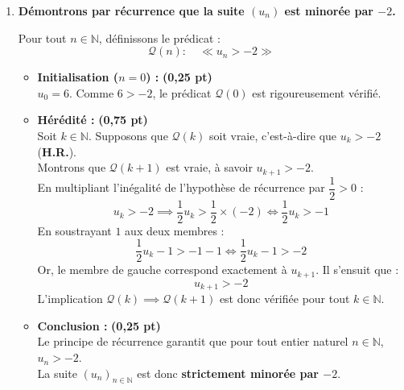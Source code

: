 \documentclass[11pt,a4paper]{article}
\newcommand{\bareme}[1]{\hfill\textbf{\textcolor{secondary}{\sffamily[#1]}}}
\newcommand{\pts}[1]{\textbf{\textcolor{secondary}{\sffamily(#1)}}}
\newcommand{\N}{\mathbb{N}}
\begin{document}
\begin{correctionbox}[Corrigé de l'Exercice 1 \bareme{Total : 4 points}]
\begin{enumerate}[label=\textbf{\arabic*.}]
\begin{itemize}[leftmargin=*, label=$\bullet$]
        \item \textbf{Conclusion :} \pts{0,25 pt}\\
        La propriété $\mathcal{P}(0)$ est initialisée et pour tout $k \in \N$, $\mathcal{P}(k) \implies \mathcal{P}(k+1)$.\\
        D'après le principe de récurrence simple, $\mathcal{P}(n)$ est vraie pour tout tout entier naturel $n \in \N$.\\
        Par conséquent, $\forall n \in \N, \; u_n > u_{n+1}$ : la suite $(u_n)_{n \in \N}$ est \textbf{strictement décroissante}.
    \end{itemize}

    \item \textbf{Démontrons par récurrence que la suite $(u_n)$ est minorée par $-2$.} \bareme{1,25 pt}

    Pour tout $n \in \N$, définissons le prédicat :
    \[
    \mathcal{Q}(n) : \quad \ll u_n > -2 \gg
    \]

    \begin{itemize}[leftmargin=*, label=$\bullet$]
        \item \textbf{Initialisation ($n = 0$) :} \pts{0,25 pt}\\
        $u_0 = 6$. Comme $6 > -2$, le prédicat $\mathcal{Q}(0)$ est rigoureusement vérifié.

        \item \textbf{Hérédité :} \pts{0,75 pt}\\
        Soit $k \in \N$. Supposons que $\mathcal{Q}(k)$ soit vraie, c'est-à-dire que $u_k > -2$ (\textbf{H.R.}).\\
        Montrons que $\mathcal{Q}(k+1)$ est vraie, à savoir $u_{k+1} > -2$.\\
        
        En multipliant l'inégalité de l'hypothèse de récurrence par $\dfrac{1}{2} > 0$ :
        \[
        u_k > -2 \implies \frac{1}{2}u_k > \frac{1}{2} \times (-2) \iff \frac{1}{2}u_k > -1
        \]
        En soustrayant $1$ aux deux membres :
        \[
        \frac{1}{2}u_k - 1 > -1 - 1 \iff \frac{1}{2}u_k - 1 > -2
        \]
        Or, le membre de gauche correspond exactement à $u_{k+1}$. Il s'ensuit que :
        \[
        u_{k+1} > -2
        \]
        L'implication $\mathcal{Q}(k) \implies \mathcal{Q}(k+1)$ est donc vérifiée pour tout $k \in \N$.

        \item \textbf{Conclusion :} \pts{0,25 pt}\\
        Le principe de récurrence garantit que pour tout entier naturel $n \in \N$, $u_n > -2$.\\
        La suite $(u_n)_{n \in \N}$ est donc \textbf{strictement minorée par $-2$}.
    \end{itemize}


\end{enumerate}
\end{correctionbox}
\end{document}
